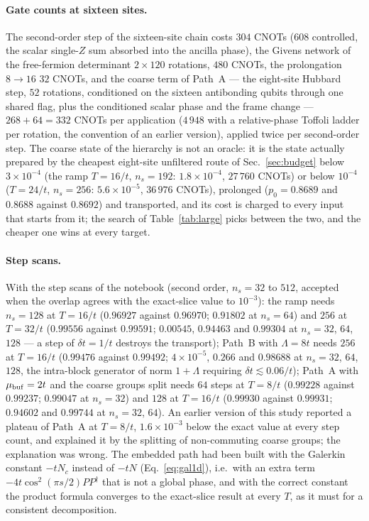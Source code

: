 \documentclass[a4paper,11pt,noarxiv]{quantumarticle}
\begin{document}
\paragraph{Gate counts at sixteen sites.}
The second-order step of the sixteen-site chain costs $304$ CNOTs ($608$
controlled, the scalar single-$Z$ sum absorbed into the ancilla phase), the
Givens network of the free-fermion determinant $2\times120$ rotations,
$480$ CNOTs, the prolongation $8\to16$ $32$ CNOTs, and the coarse term of
Path~A --- the eight-site Hubbard step, $52$ rotations, conditioned on the
sixteen antibonding qubits through one shared flag, plus the conditioned
scalar phase and the frame change --- $268+64=332$ CNOTs per application
($4\,948$ with a relative-phase Toffoli ladder per rotation, the convention
of an earlier version), applied twice per second-order step.  The coarse
state of the hierarchy is not an oracle: it is the state actually prepared
by the cheapest eight-site unfiltered route of Sec.~\ref{sec:budget}
below $3\times10^{-4}$ (the ramp $T=16/t$, $n_s=192$: $1.8\times10^{-4}$,
$27\,760$ CNOTs) or below $10^{-4}$ ($T=24/t$, $n_s=256$:
$5.6\times10^{-5}$, $36\,976$ CNOTs), prolonged ($p_0=0.8689$ and
$0.8688$ against $0.8692$) and transported, and its cost is charged to
every input that starts from it; the search of Table~\ref{tab:large}
picks between the two, and the cheaper one wins at every target.

\paragraph{Step scans.}
With the step scans of the notebook (second order, $n_s=32$ to $512$,
accepted when the overlap agrees with the exact-slice value to $10^{-3}$):
the ramp needs $n_s=128$ at $T=16/t$ ($0.96927$ against $0.96970$;
$0.91802$ at $n_s=64$) and $256$ at $T=32/t$ ($0.99556$ against $0.99591$;
$0.00545$, $0.94463$ and $0.99304$ at $n_s=32$, $64$, $128$ --- a step of
$\delta t=1/t$ destroys the transport); Path~B with $\Lambda=8t$ needs
$256$ at $T=16/t$ ($0.99476$ against $0.99492$; $4\times10^{-5}$, $0.266$
and $0.98688$ at $n_s=32$, $64$, $128$, the intra-block generator of norm
$1+\Lambda$ requiring $\delta t\lesssim0.06/t$); Path~A with
$\mu_{\rm buf}=2t$ and the coarse groups split needs $64$ steps at $T=8/t$
($0.99228$ against $0.99237$; $0.99047$ at $n_s=32$) and $128$ at $T=16/t$
($0.99930$ against $0.99931$; $0.94602$ and $0.99744$ at $n_s=32$, $64$).
An earlier version of this study reported a plateau of Path~A at $T=8/t$,
$1.6\times10^{-3}$ below the exact value at every step count, and explained
it by the splitting of non-commuting coarse groups; the explanation was
wrong.  The embedded path had been built with the Galerkin constant $-tN_c$
instead of $-tN$ (Eq.~\eqref{eq:gal1d}), i.e.\ with an extra term
$-4t\cos^2(\pi s/2)PP^\dagger$ that is not a global phase, and with the
correct constant the product formula converges to the exact-slice result at
every $T$, as it must for a consistent decomposition.
\end{document}
